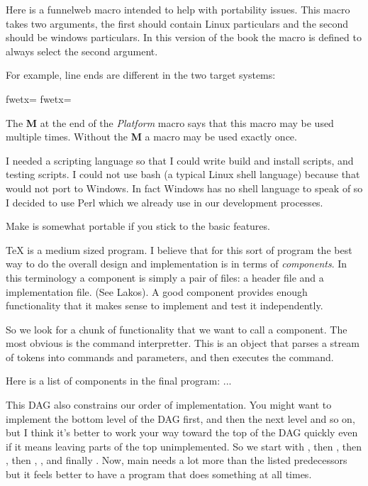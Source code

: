 Here is a funnelweb macro intended to help with portability issues.
This macro takes two arguments, the first should contain Linux
particulars and the second should be windows particulars. In this
version of the book the macro is defined to always select the second
argument.



\fwbeginmacro
{}\fwmany{}\fwequals \fwodef {}\fwcdef 
\fwbeginmacronotes
{}
\fwendmacronotes
\fwendmacro


For example, line ends are different in the two target systems:

\fwbeginmacro
{}\fwequals \fwodef {}\fwoparen \fwoquote\fwbtx[10]fwetx=%
\fwcquote\fwcomma \fwoquote\fwbtx[13 10]fwetx=%
\fwcquote\fwcparen \fwcdef 
\fwbeginmacronotes
{}
\fwendmacronotes
\fwendmacro


The {\bf M} at the end of the {\it Platform} macro says that this macro
may be used multiple times. Without the {\bf M} a macro may be used
exactly once.


I needed a scripting language so that I could write build and install
scripts, and testing scripts. I could not use bash (a typical Linux
shell language) because that would not port to Windows. In fact Windows
has no shell language to speak of so I decided to use Perl which we
already use in our development processes.

Make is somewhat portable if you stick to the basic features.


\TeX{} is a medium sized program. I believe that for this sort of
program the best way to do the overall design and implementation is in
terms of {\it components}.  In this terminology a component is simply
a pair of files: a  header file and a  implementation
file. (See Lakos). A good component provides enough functionality that
it makes sense to implement and test it independently.

So we look for a chunk of functionality that we want to call a
component. The most obvious is the command interpretter. This is an
object that parses a stream of tokens into commands and parameters,
and then executes the command.

Here is a list of components in the final program:
...

This DAG also constrains our order of implementation. You might want to
implement the bottom level of the DAG first, and then the next level
and so on, but I think it's better to work your way toward the top of
the DAG quickly even if it means leaving parts of the top
unimplemented. So we start with , then , then
, then , , and finally . Now,
main needs a lot more than the listed predecessors but it feels better
to have a program that does something at all times.

